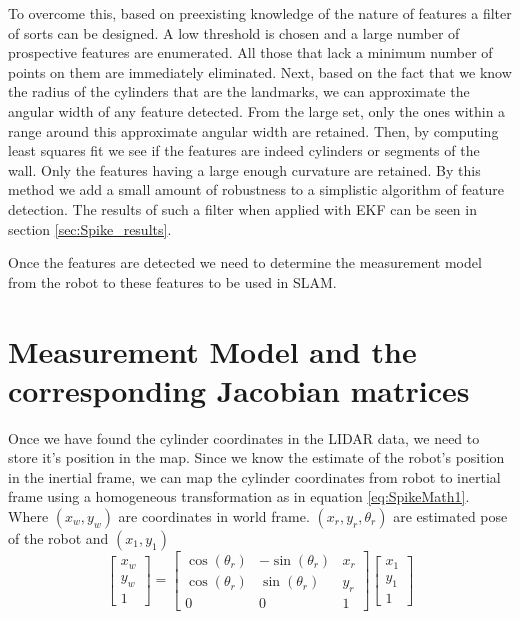 To overcome this, based on preexisting knowledge of the nature of features a filter of sorts can be designed. A low threshold is chosen and a large number of prospective features are enumerated. All those that lack a minimum number of points on them are immediately eliminated. Next, based on the fact that we know the radius of the cylinders that are the landmarks, we can approximate the angular width of any feature detected. From the large set, only the ones within a range around this approximate angular width are retained. Then, by computing least squares fit we see if the features are indeed cylinders or segments of the wall. Only the features having a large enough curvature are retained. By this method we add a small amount of robustness to a simplistic algorithm of feature detection. The results of such a filter when applied with EKF can be seen in section \ref{sec:Spike_results}.

Once the features are detected we need to determine the measurement model from the robot to these features to be used in \ekf SLAM. 

\section{Measurement Model and the corresponding Jacobian matrices}
\label{sec:Spike_math}

Once we have found the cylinder coordinates in the LIDAR data, we need to store it's position in the map. Since we know the estimate of the robot's position in the inertial frame, we can map the cylinder coordinates from robot to inertial frame using a homogeneous transformation as in equation \ref{eq:SpikeMath1}. Where $ (x_w,y_w) $ are coordinates in world frame. $ (x_r,y_r,\theta_r) $ are estimated pose of the robot and $ (x_1,y_1) $
\begin{equation}
\begin{bmatrix}
x_w\\y_w\\1
\end{bmatrix}=
\begin{bmatrix}
\cos(\theta_r) & -\sin(\theta_r) & x_r\\
\cos(\theta_r) & \sin(\theta_r) & y_r\\
0 & 0 & 1
\end{bmatrix}
\begin{bmatrix}
x_1\\y_1\\1
\end{bmatrix}
\label{eq:SpikeMath1}
\end{equation}

